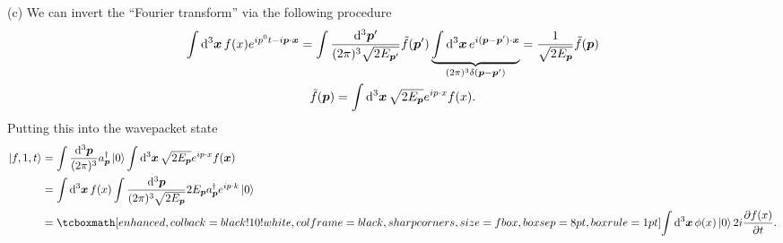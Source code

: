 {(c) We can invert the ``Fourier transform'' via the following procedure
\begin{gather}
    \int \dd[3]{\vb*{x}} f(x) e^{i p^{0} t - i \vb*{p} \cdot \vb*{x}} = \int \frac{\dd[3]{\vb*{p}'}}{(2 \pi)^3 \sqrt{2 E_{\vb*{p}'}}} \tilde{f}(\vb*{p}') \underbrace{ \int \dd[3]{\vb*{x}} e^{i ( \vb*{p} - \vb*{p}') \cdot \vb*{x}} }_{(2 \pi)^3 \delta(\vb*{p} - \vb*{p}')} = \frac{1}{\sqrt{2 E_{\vb*{p}}}} \tilde{f}(\vb*{p}) \nonumber \\
    \tilde{f}(\vb*{p}) = \int \dd[3]{\vb*{x}} \sqrt{2 E_{\vb*{p}}} e^{i p \cdot x} f(x)
.\end{gather}
Putting this into the wavepacket state
\begin{align}
    \ket{f,1,t} &= \int \frac{\dd[3]{\vb*{p}}}{(2 \pi)^3} a_{\vb*{p}}^{\dagger} \ket{0} \int \dd[3]{\vb*{x}} \sqrt{2 E_{\vb*{p}}} e^{i p \cdot x} f(\vb*{x}) \nonumber \\
                &= \int \dd[3]{\vb*{x}} f(x) \int \frac{\dd[3]{\vb*{p}}}{(2 \pi)^3 \sqrt{2 E_{\vb*{p}}}} 2 E_{\vb*{p}} a_{\vb*{p}}^{\dagger} e^{i p \cdot k} \ket{0} \nonumber \\
                &= \eqbox{ \int \dd[3]{\vb*{x}} \phi(x) \ket{0} 2 i \pdv{f(x)}{t} }
.\end{align}


}
